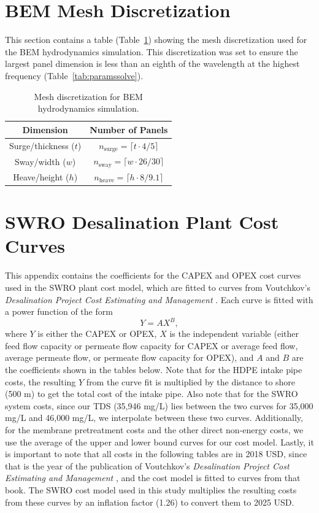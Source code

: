 \documentclass[a4paper,12pt]{elsarticle}
\begin{document}
\section{BEM Mesh Discretization} \label{app:mesh}

This section contains a table (Table~\ref{tab:mesh}) showing the mesh discretization used for the BEM hydrodynamics simulation. This discretization was set to ensure the largest panel dimension is less than an eighth of the wavelength at the highest frequency (Table~\ref{tab:paramssolve}). 

\begin{table}[h]
    \centering
    \caption{Mesh discretization for BEM hydrodynamics simulation.}
    \begin{tabular}{cc}
        \hline
        \textbf{Dimension} & \textbf{Number of Panels} \\
        \hline
        Surge/thickness ($t$) & $n_{\text{surge}} = \lceil t \cdot 4/5 \rceil$ \\
        Sway/width ($w$) & $n_{\text{sway}} = \lceil w \cdot 26/30 \rceil$ \\
        Heave/height ($h$) & $n_{\text{heave}} = \lceil h \cdot 8/9.1 \rceil$ \\
        \hline
    \end{tabular}
    \label{tab:mesh}
\end{table}

\section{SWRO Desalination Plant Cost Curves} \label{app:swro_curves}

This appendix contains the coefficients for the CAPEX and OPEX cost curves used in the SWRO plant cost model, which are fitted to curves from Voutchkov’s \emph{Desalination Project Cost Estimating and Management} \cite{voutch}. Each curve is fitted with a power function of the form 
\begin{equation}
    Y = A X^B,
\end{equation}
where $Y$ is either the CAPEX or OPEX, $X$ is the independent variable (either feed flow capacity or permeate flow capacity for CAPEX or average feed flow, average permeate flow, or permeate flow capacity for OPEX), and $A$ and $B$ are the coefficients shown in the tables below. Note that for the HDPE intake pipe costs, the resulting $Y$ from the curve fit is multiplied by the distance to shore (500 m) to get the total cost of the intake pipe. Also note that for the SWRO system costs, since our TDS (35,946 mg/L) lies between the two curves for 35,000 mg/L and 46,000 mg/L, we interpolate between these two curves. Additionally, for the membrane pretreatment costs and the other direct non-energy costs, we use the average of the upper and lower bound curves for our cost model. Lastly, it is important to note that all costs in the following tables are in 2018 USD, since that is the year of the publication of Voutchkov’s \emph{Desalination Project Cost Estimating and Management} \cite{voutch}, and the cost model is fitted to curves from that book. The SWRO cost model used in this study multiplies the resulting costs from these curves by an inflation factor (1.26) to convert them to 2025 USD.
\end{document}
